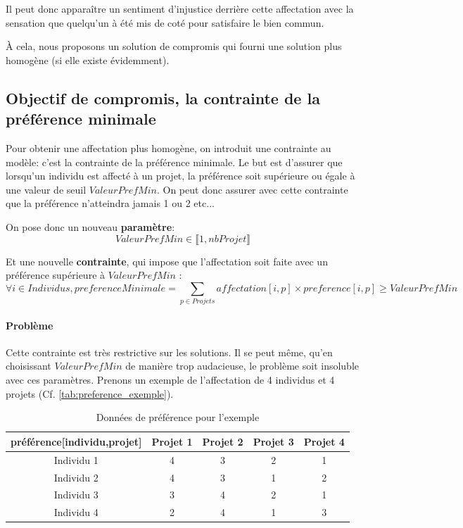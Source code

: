 \documentclass[final,poster]{polytech/polytech}
\begin{document}
Il peut donc apparaître un sentiment d'injustice derrière cette affectation avec la sensation que quelqu'un à été mis de coté pour satisfaire le bien commun.

\`A cela, nous proposons un solution de compromis qui fourni une solution plus homogène (si elle existe évidemment).

\subsection{Objectif de compromis, la contrainte de la préférence minimale}
\label{sec:pref_min}

Pour obtenir une affectation plus homogène, on introduit une contrainte au modèle: c'est la contrainte de la préférence minimale.
Le but est d'assurer que lorsqu'un individu est affecté à un projet, la préférence soit supérieure ou égale à une valeur de seuil $ValeurPrefMin$.
On peut donc assurer avec cette contrainte que la préférence n'atteindra jamais 1 ou 2 etc...

On pose donc un nouveau \textbf{paramètre}:
$$
ValeurPrefMin \in \llbracket 1,nbProjet \rrbracket
$$

Et une nouvelle \textbf{contrainte}, qui impose que l'affectation soit faite avec un préférence supérieure à $ValeurPrefMin$ :
$$
\forall i \in Individus ,preferenceMinimale = \sum_{p \in Projets} affectation[i,p]\times preference[i,p] \geqslant ValeurPrefMin
$$

\paragraph{Problème} Cette contrainte est très restrictive sur les solutions. Il se peut même, qu'en choisissant $ValeurPrefMin$ de manière trop audacieuse, le problème soit insoluble avec ces paramètres.
Prenons un exemple de l'affectation de 4 individus et 4 projets (Cf. \autoref{tab:preference_exemple}).

\begin{table}
\caption{\label{tab:preference_exemple}Données de préférence pour l'exemple}
\begin{tabular}{|c|c|c|c|c|}
\hline
préférence[individu,projet] & Projet 1 & Projet 2 & Projet 3 & Projet 4 \\
\hline
Individu 1 & 4 & 3 & 2 & 1 \\
\hline
Individu 2 & 4 & 3 & 1 & 2 \\
\hline
Individu 3 & 3 & 4 & 2 & 1 \\
\hline
Individu 4 & 2 & 4 & 1 & 3 \\
\hline
\end{tabular}
\end{table}
\end{document}
